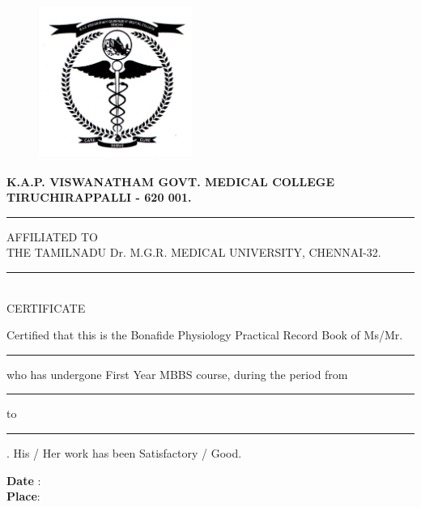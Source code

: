 \documentclass[a4paper,12pt,openany,oneside]{book}
\begin{document}
\newpage
\vspace*{\fill}
\begin{center}
\begin{figure}[H]
	\centering
	\includegraphics[height=5cm,width=5cm]{./collegeEmblem/collegeEmblem.jpg}
\end{figure}
	\textbf{\Huge {K.A.P. VISWANATHAM GOVT. MEDICAL COLLEGE}}\\
	\textbf{\Large{TIRUCHIRAPPALLI - 620 001.}}\\

	\rule{4in}{0.5pt}
	\parbox{3.9in}{\centering AFFILIATED TO\\ THE TAMILNADU Dr. M.G.R. MEDICAL UNIVERSITY, CHENNAI-32.}
	\rule{4in}{0.5pt}\\
	{\centering \LARGE{CERTIFICATE\\}}
\end{center}
	\par
	{\large{
	Certified that this is the Bonafide Physiology Practical Record Book of Ms/Mr. \rule{3.5in}{.5pt}who has undergone First Year MBBS course, during the period from \rule{1in}{.5pt} to \rule{1in}{.5pt}.  His / Her work has been Satisfactory / Good.\\
	}
	}


\begin{table}[H]
 \renewcommand{\arraystretch}{.6} \centering
 \end{table}

\noindent \textbf{Date} :\\
\textbf{Place}:\\
\vspace*{\fill}
\end{document}
